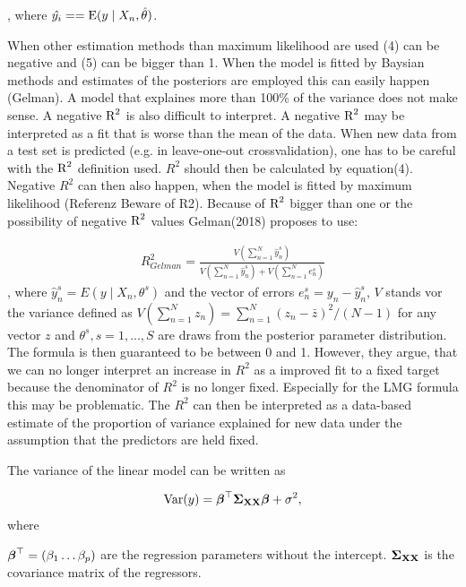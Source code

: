 \documentclass[11pt,a4paper,twoside]{book}
\begin{document}
, where $\hat{y_{i}} = = \operatorname{E} ({y \mid X_{n}, \hat{\theta}})$.  

When other estimation methods than maximum likelihood are used (4) can be negative and (5) can be bigger than 1. When the model is fitted by Baysian methods and estimates of the posteriors are employed this can easily happen (Gelman). A model that explaines more than 100\% of the variance does not make sense. A negative $\text{R}^2$ is also difficult to interpret. A negative $\text{R}^2$ may be interpreted as a fit that is worse than the mean of the data. When new data from a test set is predicted (e.g. in leave-one-out crossvalidation), one has to be careful with the $\text{R}^2$ definition used. $R^2$ should then be calculated by equation(4). Negative $R^2$ can then also happen, when the model is fitted by maximum likelihood (Referenz Beware of R2).  Because of $\text{R}^2$ bigger than one or the possibility of negative $\text{R}^2$ values Gelman(2018) proposes to use:

      \begin{align} 
        R^2_{Gelman} = \frac{V(\sum_{n=1}^{N}\hat{y}^s_{n})}{V(\sum_{n=1}^{N}\hat{y}^s_{n})+V(\sum_{n=1}^{N}e^s_{n})} \label{eq:6} 
   \end{align} 
, where $\hat{y}^s_{n}  = E \left({y \mid X_{n}, \theta^s}\right) $ and the vector of errors $e^s_{n} = y_{n} - \hat{y}^s_{n}$, $V$ stands vor the variance defined as $V(\sum_{n=1}^{N} z_{n}) = \sum_{n=1}^{N} (z_{n} - \bar{z})^2 / (N-1)$ for any vector $z$ and $\theta^s, s = 1, ... , S$ are draws from the posterior parameter distribution. The formula is then guaranteed to be between 0 and 1.  However, they argue, that we can no longer interpret an increase in $R^2$ as a improved fit to a fixed target because the denominator of $R^2$ is no longer fixed. Especially for the LMG formula this may be problematic. The $R^2$ can then be interpreted as a data-based estimate of the proportion of variance explained for new data under the assumption that the predictors are held fixed. 

The variance of the linear model can be written as 

      \begin{align} 
        \operatorname{Var}(y) = {\boldsymbol{\beta}}^\top {\boldsymbol{\Sigma}}{}_{{\mathbf{X}} {\mathbf{X}}}  {\boldsymbol{\beta}} + \sigma^2, \label{eq:6} 
   \end{align}
where 

${\boldsymbol{\beta}}^\top = (\beta_{1} \dots \beta_{p})$ are the regression parameters without the intercept.
${\boldsymbol{\Sigma}}{}_{{\mathbf{X}} {\mathbf{X}}}$ is the covariance matrix of the regressors.
\end{document}
